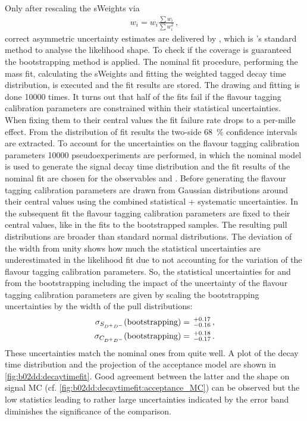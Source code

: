 Only after rescaling the sWeights via
\begin{align}
  w_i = w_i \frac{\sum w_i}{\sum w_i^2}\,,
\end{align}
correct asymmetric uncertainty estimates are delivered by \minos, which is
\root's standard method to analyse the likelihood shape. To check if the
coverage is guaranteed the bootstrapping method is applied. The nominal fit
procedure, \ie performing the mass fit, calculating the sWeights and fitting
the weighted tagged decay time distribution, is executed and the fit results
are stored. The drawing and fitting is done \num{10000} times. It turns out
that half of the fits fail if the flavour tagging calibration parameters are
constrained within their statistical uncertainties. When fixing them to their
central values the fit failure rate drops to a per-mille effect. From the
distribution of fit results the two-side \SI{68}{\percent} confidence
intervals are extracted. To account for the uncertainties on the flavour
tagging calibration parameters \num{10000} pseudoexperiments are performed, in
which the nominal model is used to generate the signal decay time distribution
and the fit results of the nominal fit are chosen for the \CP observables \SDD
and \CDD. Before generating the flavour tagging calibration parameters are
drawn from Gaussian distributions around their central values using the
combined statistical + systematic uncertainties. In the subsequent fit the
flavour tagging calibration parameters are fixed to their central values, like
in the fits to the bootstrapped samples. The resulting pull distributions are
broader than standard normal distributions. The deviation of the width from
unity shows how much the statistical uncertainties are underestimated in the
likelihood fit due to not accounting for the variation of the flavour tagging
calibration parameters. So, the statistical uncertainties for \SDD and
\CDD from the bootstrapping including the impact of the uncertainty of the
flavour tagging calibration parameters are given by scaling the bootstrapping
uncertainties by the width of the pull distributions:
\begin{align}
    \sigma_{S_{{{D}^+}{{D}^-}}}(\text{bootstrapping}) &= \,^{+0.17}_{-0.16} \,, \\
    \sigma_{C_{{{D}^+}{{D}^-}}}(\text{bootstrapping}) &= \,^{+0.18}_{-0.17} \,.
\end{align}
These uncertainties match the nominal ones from \minos quite well. A plot of
the decay time distribution and the projection of the acceptance model are
shown in \cref{fig:b02dd:decaytimefit}. Good agreement between the latter and
the shape on signal MC (cf. \cref{fig:b02dd:decaytimefit:acceptance_MC}) can
be observed but the low statistics leading to rather large uncertainties
indicated by the error band diminishes the significance of the comparison.

